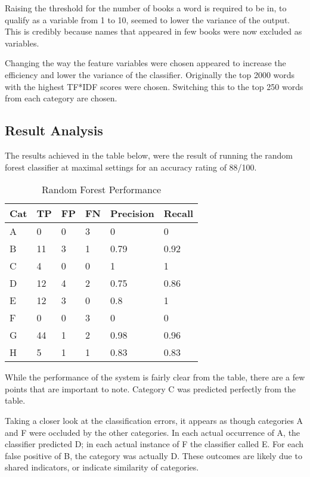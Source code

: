 \documentclass[11pt]{article}
\begin{document}
Raising the threshold for the number of books a word is required to be in, to
qualify as a variable from 1 to 10, seemed to lower the variance of the output.
This is credibly because names that appeared in few books were now excluded as
variables.

Changing the way the feature variables were chosen appeared to increase the
efficiency and lower the variance of the classifier. Originally the top 
2000 words with the highest TF*IDF scores were chosen. Switching this to the
top 250 words from each category are chosen.

\subsection{Result Analysis}

The results achieved in the table below, were the result of running the random
forest classifier at maximal settings for an accuracy rating of 88/100.

\begin{table}[h]
\begin{center}
    \begin{tabular}{|l|l|l|l|l|l|}
        \hline
        Cat & TP & FP & FN & Precision & Recall \\
        \hline \hline
        A & 0   & 0 & 3 & 0    & 0      \\
        B & 11  & 3 & 1 & 0.79 & 0.92   \\
        C & 4   & 0 & 0 & 1    & 1      \\
        D & 12  & 4 & 2 & 0.75 & 0.86   \\
        E & 12  & 3 & 0 & 0.8  & 1      \\
        F & 0   & 0 & 3 & 0    & 0      \\
        G & 44  & 1 & 2 & 0.98 & 0.96   \\
        H & 5   & 1 & 1 & 0.83 & 0.83   \\
        \hline
    \end{tabular}
\caption{Random Forest Performance}\label{table1}
\end{center}
\end{table}

While the performance of the system is fairly clear from the table, there are a
few points that are important to note. Category C was predicted perfectly from
the table.

Taking a closer look at the classification errors, it appears as though
categories A and F were occluded by the other categories. In each actual
occurrence of A, the classifier predicted D; in each actual instance of F the
classifier called E. For each false positive of B, the category was actually D.
These outcomes are likely due to shared indicators, or indicate similarity of
categories.
\end{document}
